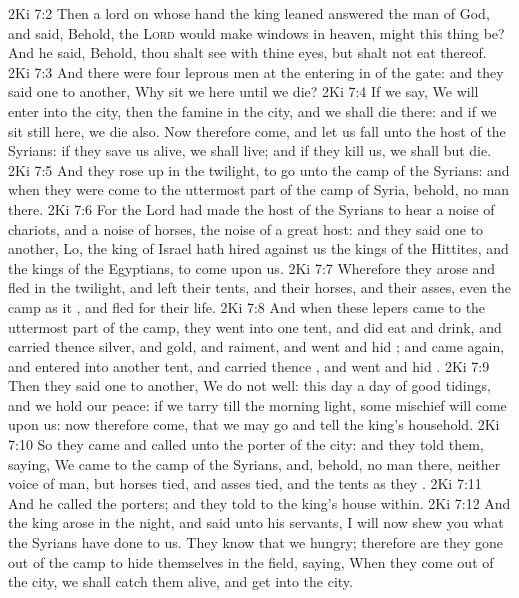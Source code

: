 \vs 2Ki 7:2 Then a lord on whose hand the king leaned answered the man of God, and said, Behold,  the \textsc{Lord} would make windows in heaven, might this thing be? And he said, Behold, thou shalt see  with thine eyes, but shalt not eat thereof.
\vs 2Ki 7:3 And there were four leprous men at the entering in of the gate: and they said one to another, Why sit we here until we die?
\vs 2Ki 7:4 If we say, We will enter into the city, then the famine  in the city, and we shall die there: and if we sit still here, we die also. Now therefore come, and let us fall unto the host of the Syrians: if they save us alive, we shall live; and if they kill us, we shall but die.
\vs 2Ki 7:5 And they rose up in the twilight, to go unto the camp of the Syrians: and when they were come to the uttermost part of the camp of Syria, behold,  no man there.
\vs 2Ki 7:6 For the Lord had made the host of the Syrians to hear a noise of chariots, and a noise of horses,  the noise of a great host: and they said one to another, Lo, the king of Israel hath hired against us the kings of the Hittites, and the kings of the Egyptians, to come upon us.
\vs 2Ki 7:7 Wherefore they arose and fled in the twilight, and left their tents, and their horses, and their asses, even the camp as it , and fled for their life.
\vs 2Ki 7:8 And when these lepers came to the uttermost part of the camp, they went into one tent, and did eat and drink, and carried thence silver, and gold, and raiment, and went and hid ; and came again, and entered into another tent, and carried thence , and went and hid .
\vs 2Ki 7:9 Then they said one to another, We do not well: this day  a day of good tidings, and we hold our peace: if we tarry till the morning light, some mischief will come upon us: now therefore come, that we may go and tell the king's household.
\vs 2Ki 7:10 So they came and called unto the porter of the city: and they told them, saying, We came to the camp of the Syrians, and, behold,  no man there, neither voice of man, but horses tied, and asses tied, and the tents as they .
\vs 2Ki 7:11 And he called the porters; and they told  to the king's house within.
\vs 2Ki 7:12 And the king arose in the night, and said unto his servants, I will now shew you what the Syrians have done to us. They know that we  hungry; therefore are they gone out of the camp to hide themselves in the field, saying, When they come out of the city, we shall catch them alive, and get into the city.
